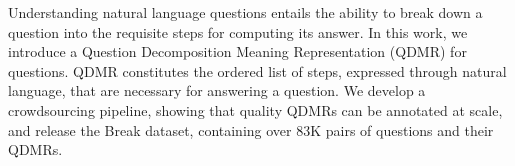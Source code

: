 Understanding natural language questions entails the ability to break down a question into the requisite steps for computing its answer. In this work, we introduce a Question Decomposition Meaning Representation (QDMR) for questions. QDMR constitutes the ordered list of steps, expressed through natural language, that are necessary for answering a question. We develop a crowdsourcing pipeline, showing that quality QDMRs can be annotated at scale, and release the Break dataset, containing over 83K pairs of questions and their QDMRs.